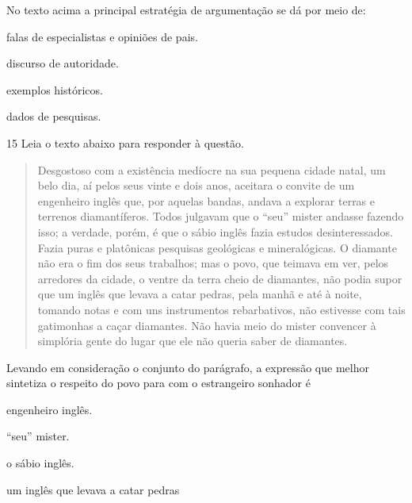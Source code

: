 
No texto acima a principal estratégia de argumentação se dá por meio de:

\begin{escolha}

    \item falas de especialistas e opiniões de pais.

    \item discurso de autoridade.

    \item exemplos históricos.

    \item dados de pesquisas.

\end{escolha}

\pagebreak

\num{15} Leia o texto abaixo para responder à questão. 


\begin{quote}

Desgostoso com a existência medíocre na sua pequena cidade natal, 
um belo dia, aí pelos seus vinte e dois anos, aceitara o convite de um
engenheiro inglês que, por aquelas bandas, andava a explorar
terras e terrenos diamantíferos. Todos julgavam que o ``seu'' mister 
andasse fazendo isso; a verdade, porém, é que o sábio inglês fazia estudos
desinteressados. Fazia puras e platônicas pesquisas geológicas e mineralógicas.
O diamante não era o fim dos seus trabalhos; mas o povo, que teimava em ver,
pelos arredores da cidade, o ventre da terra cheio de diamantes, não podia 
supor que um inglês que levava a catar pedras, pela manhã e até à noite,
tomando notas e com uns instrumentos rebarbativos, não estivesse com tais 
gatimonhas a caçar diamantes. Não havia meio do mister convencer à simplória 
gente do lugar que ele não queria saber de diamantes. 

\end{quote}


Levando em consideração o conjunto do parágrafo, a expressão que melhor 
sintetiza o respeito do povo para com o estrangeiro sonhador é

\begin{escolha}

    \item engenheiro inglês.

    \item ``seu'' mister.

    \item o sábio inglês. 

    \item um inglês que levava a catar pedras

\end{escolha}